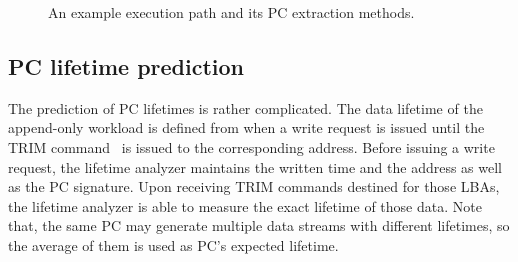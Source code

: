 \begin{figure}[b]
	\vspace{-15pt}
	\centering
	\vspace{-10pt}
	\hfill
	\vspace{-8pt}
	\caption{An example execution path and its PC extraction methods.}
	\label{fig:getpc}
\end{figure}

\vspace{-5pt}
\subsection{PC lifetime prediction}
The prediction of PC lifetimes is rather complicated. 
The data lifetime of the append-only workload is defined 
from when a write request is issued until the TRIM command~\cite{TRIM} is issued to 
the corresponding address.
Before issuing a write request, the lifetime analyzer
maintains the written time and the address as well as the PC signature.
Upon receiving TRIM
commands destined for those LBAs, the lifetime analyzer is able to measure the
exact lifetime of those data. 
Note that, the
same PC may generate multiple data streams with different lifetimes, 
so the average of them is used as PC's expected lifetime.


\vspace{-5pt}
